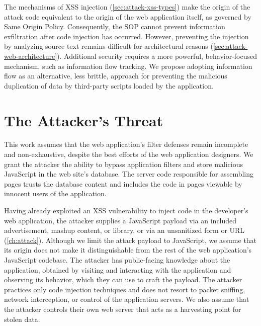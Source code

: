 
The mechanisms of XSS injection (\autoref{sec:attack-xss-types}) make the origin of the attack code equivalent to the origin of the web application itself, as governed by Same Origin Policy.
Consequently, the SOP cannot prevent information exfiltration after code injection has occurred.
However, preventing the injection by analyzing source text remains difficult for architectural reasons (\autoref{sec:attack-web-architecture}).
Additional security requires a more powerful, behavior-focused mechanism, such as information flow tracking.
We propose adopting information flow as an alternative, less brittle, approach for preventing the malicious duplication of data by third-party scripts loaded by the application.

\section{The Attacker's Threat}\label{sec:defense-attackers-threat}

This work assumes that the web application's filter defenses remain incomplete and non-exhaustive, despite the best efforts of the web application designers.
We grant the attacker the ability to bypass application filters and store malicious JavaScript in the web site's database.
The server code responsible for assembling pages trusts the database content and includes the code in pages viewable by innocent users of the application.

Having already exploited an XSS vulnerability to inject code in the developer's web application, the attacker supplies a JavaScript payload via an included advertisement, mashup content, or library, or via an unsanitized form or URL (\autoref{ch:attack}).
Although we limit the attack payload to JavaScript, we assume that its origin does not make it distinguishable from the rest of the web application's JavaScript codebase.
The attacker has public-facing knowledge about the application, obtained by visiting and interacting with the application and observing its behavior, which they can use to craft the payload.
The attacker practices only code injection techniques and does not resort to packet sniffing, network interception, or control of the application servers.
We also assume that the attacker controls their own web server that acts as a harvesting point for stolen data.

